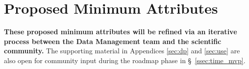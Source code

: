 \documentclass[DM,lsstdraft,toc]{lsstdoc}
\begin{document}

\clearpage
\section{Proposed Minimum Attributes}\label{sec:mvp}

\textbf{These proposed minimum attributes will be refined via an iterative process between the Data Management team and the scientific community.} The supporting material in Appendices \ref{sec:dp} and \ref{sec:use} are also open for community input during the roadmap phase in \S~\ref{ssec:time_mvp}.
\end{document}
